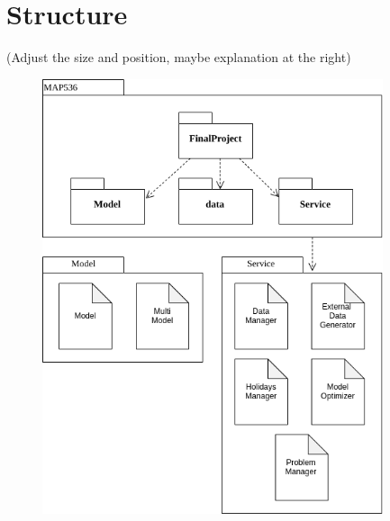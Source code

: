 \documentclass[a4paper,12pt,twoside]{article}
\begin{document}
\section{Structure}
(Adjust the size and position, maybe explanation at the right)
\begin{figure}[H]
	\includegraphics[width=100mm,scale=0.5]{UML.png}
\end{figure}
\end{document}
